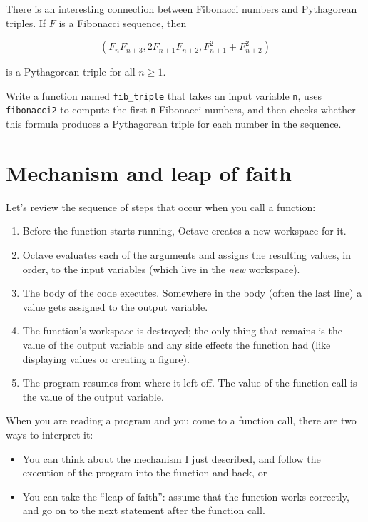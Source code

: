 \documentclass{book}
\begin{document}
There is an interesting connection between Fibonacci numbers and
Pythagorean triples. If $F$ is a Fibonacci sequence, then

\[ (F_n F_{n+3}, 2 F_{n+1} F_{n+2}, F_{n+1}^2 + F_{n+2}^2 ) \]

is a Pythagorean triple for all $n \ge 1$.

\begin{ex}
Write a function named {\tt fib\_triple} that
takes an input variable {\tt n}, uses {\tt fibonacci2} to compute
the first {\tt n} Fibonacci numbers, and then checks whether 
this formula produces a Pythagorean triple for each number
in the sequence.
\end{ex}



\section{Mechanism and leap of faith}

Let's review the sequence of steps that occur when you call
a function:

\begin{enumerate}

\item Before the function starts running, Octave creates a new
workspace for it.

\item Octave evaluates each of the arguments and assigns
the resulting values, in order, to the input variables (which
live in the {\em new} workspace).

\item The body of the code executes. Somewhere in the body
(often the last line) a value gets assigned to the output variable.

\item The function's workspace is destroyed; the only thing
that remains is the value of the output variable and any side
effects the function had (like displaying values or creating
a figure).

\item The program resumes from where it left off. The value
of the function call is the value of the output variable.

\end{enumerate}

When you are reading a program and you come to a function call,
there are two ways to interpret it:

\begin{itemize}

\item You can think about the mechanism I just described,
and follow the execution of the program into the function and back, or

\item You can take the ``leap of faith'': assume that the function
works correctly, and go on to the next statement after the
function call.

\end{itemize}
\end{document}
